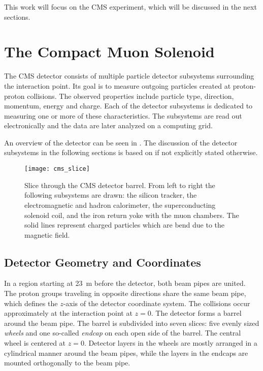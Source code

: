 This work will focus on the \ac{CMS} experiment, which will be discussed in the next sections.

\section{The Compact Muon Solenoid}
The \ac{CMS} detector consists of multiple particle detector subsystems surrounding the interaction point.
Its goal is to measure outgoing particles created at proton-proton collisions.
The observed properties include particle type, direction, momentum, energy and charge. Each of the detector subsystems is dedicated to measuring one or more of these characteristics. The subsystems are read out electronically and the data are later analyzed on a computing grid.

An overview of the detector can be seen in . The discussion of the detector subsystems in the following sections is based on \cite{Chatrchyan:CMSexperimentCERN} if not explicitly stated otherwise.

\begin{figure}
    \centering
    \hspace{0.01\textwidth}
    \texttt{[image: cms\_slice]}
    \caption{Slice through the CMS detector barrel. From left to right the following subsystems are drawn: the silicon tracker, the electromagnetic and hadron calorimeter, the superconducting solenoid coil, and the iron return yoke with the muon chambers. The solid lines represent charged particles which are bend due to the magnetic field\cite[modified]{Davis:CMSSlice}.}
    \label{fig:CMS_slice}
\end{figure}

\subsection{Detector Geometry and Coordinates}
In a region starting at \SI{23}{\m} before the detector, both beam pipes are united\cite{Evans:LHCMachine}. The proton groups traveling in opposite directions share the same beam pipe, which defines the $z$-axis of the detector coordinate system. The collisions occur approximately at the interaction point at $z = 0$.
The detector forms a barrel around the beam pipe. The barrel is subdivided into seven slices: five evenly sized \emph{wheels} and one so-called \emph{endcap} on each open side of the barrel. The central wheel is centered at $z = 0$.
Detector layers in the wheels are mostly arranged in a cylindrical manner around the beam pipes, while the layers in the endcaps are mounted orthogonally to the beam pipe.

